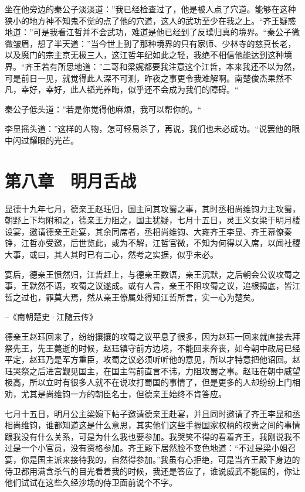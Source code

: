坐在他旁边的秦公子淡淡道：”我已经检查过了，他是被人点了穴道。能够在这种狭小的地方神不知鬼不觉的点了他的穴道，这人的武功至少在我之上。“齐王疑惑地道：”可是我看江哲并不会武功，难道是他已经到了反璞归真的境界。“秦公子微微皱眉，想了半天道：”当今世上到了那种境界的只有家师、少林寺的慈真长老，以及魔门的宗主京无极三人，这江哲年纪如此之轻，我绝不相信他能达到这种境界。“齐王若有所思地道：”二哥和梁婉都要我注意这个江哲，本来我还不以为然，可是前日一见，就觉得此人深不可测，昨夜之事更令我难解啊。南楚俊杰果然不凡，幸好，幸好，此人韬光养晦，似乎还不会成为我们的障碍。“

秦公子低头道：”若是你觉得他麻烦，我可以帮你的。“

李显摇头道：”这样的人物，怎可轻易杀了，再说，我们也未必成功。“说罢他的眼中闪过耀眼的光芒。

\chapter{第八章　明月舌战}

显德十九年七月，德亲王赵珏归，国主问其攻蜀之事，其时丞相尚维钧力主攻蜀，朝野上下均附和之，德亲王力阻之，国主犹疑，七月十五日，灵王义女梁于明月楼设宴，邀请德亲王赴宴，其余同席者，丞相尚维钧、大雍齐王李显、齐王幕僚秦铮，江哲亦受邀，后世览此，或为不解，江哲官微，不知为何得以入席，以闻社稷大事，或曰，其人其时已有二心，然考之实据，似乎未必。

宴后，德亲王愤然归，江哲赶上，与德亲王数语，亲王沉默，之后朝会公议攻蜀之事，王默然不语，攻蜀之议遂成。或有人言，亲王不阻攻蜀之议，追根揭底，皆江哲之过也，罪莫大焉，然从亲王僚属处得知江哲所言，实一心为楚矣。

--《南朝楚史·江随云传》

德亲王赵珏回来了，纷纷攘攘的攻蜀之议平息了很多，因为赵珏一回来就直接去拜祭先王，先王薨逝的时候，赵珏镇守前方边境，不能回来奔丧，如今朝中政局已经平定，赵珏乃是军方重臣，攻蜀之议必须听听他的意见，所以才特意把他诏回。赵珏哭祭之后进宫觐见国主，在国主驾前直言不讳，力阻攻蜀之事。赵珏在朝中威望极高，所以立时有很多人就不在说攻打蜀国的事情了，但是更多的人却纷纷上门相劝，尤其是尚维钧一方的朝臣名士，但德亲王始终不肯答应。

七月十五日，明月公主梁婉下帖子邀请德亲王赴宴，并且同时邀请了齐王李显和丞相尚维钧，谁都知道这是什么意思，其实他们这些手握国家权柄的权贵之间的事情跟我没有什么关系，可是为什么我也要参加。我哭笑不得的看着齐王，我刚说我不过是一个小官员，没有资格参加。齐王殿下居然脸不变色地道：“不过是梁小姐召宴，你是国主派来接待我的，自然得参加。”我虽有心拒绝，可是当齐王殿下身边的侍卫都用满含杀气的目光看着我的时候，我还是答应了，谁说威武不能屈的，你让他们试试在这些久经沙场的侍卫面前说个不字。

